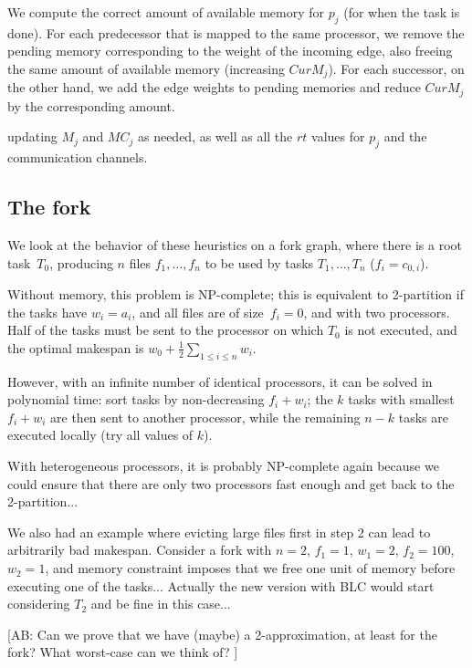 \documentclass[sigconf,review,anonymous]{acmart}
\newcommand{\MM}{M}
\newcommand{\MC}{MC}
\newcommand{\AB}[1]{{\color{purple}[AB: #1]}}
\begin{document}
    \textbullet We compute the correct amount of available memory for $p_j$ (for when the task is done).
For each predecessor that is mapped to the same processor, we remove the pending memory corresponding to the weight of
    the incoming edge, also freeing the same amount of available memory (increasing $CurM_j$).
For each successor, on the other hand, we add the edge weights to pending memories and reduce $CurM_j$ by the corresponding
    amount.



    updating $\MM_j$ and $\MC_j$ as needed,
as well as all the $rt$ values for $p_j$ and the communication channels.



\subsection{The fork}
We look at the behavior of these heuristics on a fork graph,
where there is a root task~$T_0$, producing $n$ files $f_1, \ldots, f_n$
to be used by tasks $T_1, \ldots, T_n$ ($f_i = c_{0,i}$).

Without memory, this problem is NP-complete; this is equivalent
to 2-partition if the tasks have $w_i=a_i$, and all files are of size~$f_i=0$,
and with two processors. Half of the tasks must be sent to the processor
on which $T_0$ is not executed, and the optimal makespan is 
$w_0+\frac{1}{2}\sum_{1\leq i \leq n} w_i$.

However, with an infinite number of identical processors, it can be
solved in polynomial time: sort tasks by non-decreasing $f_i+w_i$; 
the $k$ tasks with smallest $f_i+w_i$ are then sent to another processor,
while the remaining $n-k$ tasks are executed locally (try all values of $k$).

With heterogeneous processors, it is probably NP-complete again
because we could ensure that there are only two processors fast enough
and get back to the 2-partition...

We also had an example where evicting large files first in step 2
can lead to arbitrarily bad makespan. Consider a fork with $n=2$,
$f_1=1$, $w_1=2$, $f_2=100$, $w_2=1$, and memory constraint
imposes that we free one unit of memory before executing one
of the tasks... Actually the new version with BLC would start 
considering $T_2$ and be fine in this case...


\AB{Can we prove that we have (maybe) a 2-approximation, 
at least for the fork? What worst-case can we think of? }
\end{document}
